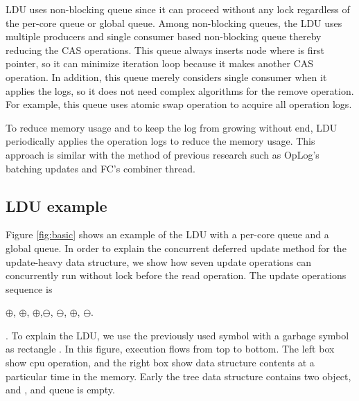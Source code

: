 LDU uses non-blocking queue since it can proceed without any lock regardless
of the per-core queue or global queue.
Among non-blocking queues, the LDU uses multiple producers and single consumer
based non-blocking queue thereby reducing the CAS operations.
This queue always inserts node where is first pointer, so it can minimize
iteration loop because it makes another CAS operation.
In addition, this queue merely considers single consumer when it applies
the logs, so it does not need complex algorithms for the remove operation.
For example, this queue uses atomic swap operation to acquire all operation 
logs.


To reduce memory usage and to keep the log from growing without end, LDU
periodically applies the operation logs to reduce the memory usage.
This approach is similar with the method of previous research such as OpLog's
batching updates and FC's combiner thread.


\subsection{LDU example}



Figure \ref{fig:basic} shows an example of the LDU with a per-core queue and
a global queue.
In order to explain the concurrent deferred update method for the update-heavy
data structure, we show how seven update operations can concurrently run
without lock before the read operation.
The update operations sequence is
\begin{center}
$\oplus$, $\oplus$, $\oplus$,$\ominus$,
$\ominus$, $\oplus$, $\ominus$. 
\end{center}.
To explain the LDU, we use the previously used symbol with a garbage symbol as
rectangle .
In this figure, execution flows from top to bottom.
The left box show cpu operation, and the right box show data structure
contents at a particular time in the memory.
Early the tree data structure contains two object,  and ,
and queue is empty.

